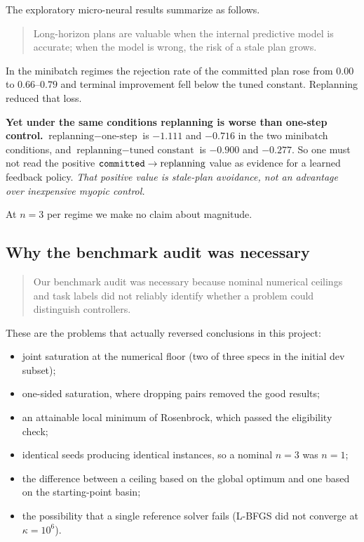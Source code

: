 The exploratory micro-neural results summarize as follows.

\begin{quote}
Long-horizon plans are valuable when the internal predictive model is accurate; when
the model is wrong, the risk of a stale plan grows.
\end{quote}

In the minibatch regimes the rejection rate of the committed plan rose from $0.00$ to
$0.66$--$0.79$ and terminal improvement fell below the tuned constant. Replanning
reduced that loss.

\textbf{Yet under the same conditions replanning is worse than one-step control.}
$\text{replanning} - \text{one-step}$ is $-1.111$ and $-0.716$ in the two minibatch
conditions, and $\text{replanning} - \text{tuned constant}$ is $-0.900$ and $-0.277$.
So one must not read the positive $\texttt{committed} \rightarrow \text{replanning}$
value as evidence for a learned feedback policy. \emph{That positive value is
stale-plan avoidance, not an advantage over inexpensive myopic control.}

At $n = 3$ per regime we make no claim about magnitude.

\subsection{Why the benchmark audit was necessary}
\label{sec:audit-why}

\begin{quote}
Our benchmark audit was necessary because nominal numerical ceilings and task labels
did not reliably identify whether a problem could distinguish controllers.
\end{quote}

These are the problems that actually reversed conclusions in this project:

\begin{itemize}
  \item joint saturation at the numerical floor (two of three specs in the initial
        dev subset);
  \item one-sided saturation, where dropping pairs removed the good results;
  \item an attainable local minimum of Rosenbrock, which passed the eligibility
        check;
  \item identical seeds producing identical instances, so a nominal $n = 3$ was
        $n = 1$;
  \item the difference between a ceiling based on the global optimum and one based on
        the starting-point basin;
  \item the possibility that a single reference solver fails (L-BFGS did not
        converge at $\kappa = 10^6$).
\end{itemize}

